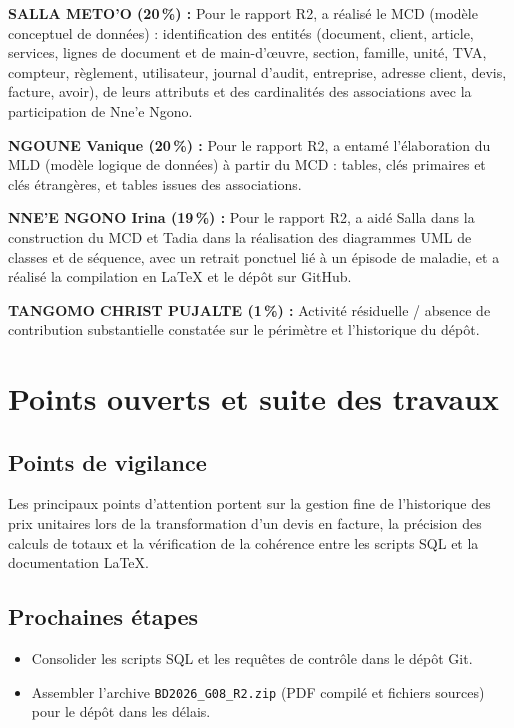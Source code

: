 \documentclass[11pt,a4paper]{article}
\begin{document}
\textbf{SALLA METO'O (20\,\%) :} Pour le rapport R2, a r\'ealis\'e le MCD (mod\`ele conceptuel de donn\'ees) : identification des entit\'es (document, client, article, services, lignes de document et de main-d'\oe uvre, section, famille, unit\'e, TVA, compteur, r\`eglement, utilisateur, journal d'audit, entreprise, adresse client, devis, facture, avoir), de leurs attributs et des cardinalit\'es des associations avec la participation de Nne'e Ngono.

\textbf{NGOUNE Vanique (20\,\%) :} Pour le rapport R2, a entam\'e l'\'elaboration du MLD (mod\`ele logique de donn\'ees) \`a partir du MCD : tables, cl\'es primaires et cl\'es \'etrang\`eres, et tables issues des associations.

\textbf{NNE'E NGONO Irina (19\,\%) :} Pour le rapport R2, a aid\'e Salla dans la construction du MCD et Tadia dans la r\'ealisation des diagrammes UML de classes et de s\'equence, avec un retrait ponctuel li\'e \`a un \'episode de maladie, et a r\'ealis\'e la compilation en \LaTeX{} et le d\'ep\^ot sur GitHub.

\textbf{TANGOMO CHRIST PUJALTE (1\,\%) :} Activit\'e r\'esiduelle / absence de contribution substantielle constat\'ee sur le p\'erim\`etre et l'historique du d\'ep\^ot.

\section{Points ouverts et suite des travaux}
\subsection{Points de vigilance}
Les principaux points d'attention portent sur la gestion fine de l'historique des prix unitaires lors de la transformation d'un devis en facture, la pr\'ecision des calculs de totaux et la v\'erification de la coh\'erence entre les scripts SQL et la documentation \LaTeX{}.

\subsection{Prochaines \'etapes}
\begin{itemize}[leftmargin=1.5em]
  \item Consolider les scripts SQL et les requ\^etes de contr\^ole dans le d\'ep\^ot Git.
  \item Assembler l'archive \texttt{BD2026\_G08\_R2.zip} (PDF compil\'e et fichiers sources) pour le d\'ep\^ot dans les d\'elais.
\end{itemize}
\end{document}
